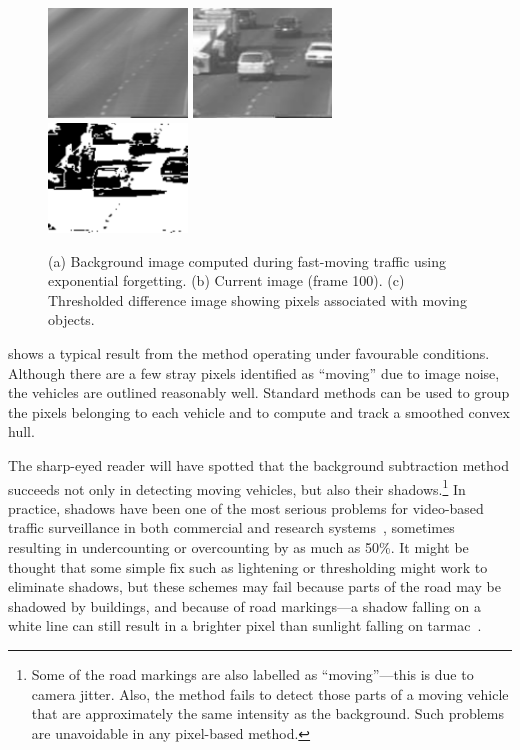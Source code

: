 \begin{figure}[t]
  \includegraphics[width=0.33\textwidth]{figures/avg_0099.pdf}
  \includegraphics[width=0.33\textwidth]{figures/img_0100.pdf}
  \includegraphics[width=0.33\textwidth]{figures/mask_0100.pdf}
  \caption{(a) Background image computed during fast-moving traffic
using exponential forgetting. (b) Current image (frame 100). (c) Thresholded
difference image showing pixels associated with moving objects.}
\label{fast-traffic-figure}
\end{figure}

 shows a typical result from the method
operating under favourable conditions. Although there are a few stray
pixels identified as ``moving'' due to image noise, the vehicles are
outlined reasonably well. Standard methods can be used to group the
pixels belonging to each vehicle and to compute and track a smoothed
convex hull.

The sharp-eyed reader will have spotted that the background
subtraction method succeeds not only in detecting moving vehicles, but
also their shadows.\footnote{Some of the road markings are also
labelled as ``moving''---this is due to camera jitter.
Also, the method fails to detect those parts of a moving vehicle that
are approximately the same intensity as the background.
Such problems are unavoidable in any pixel-based method.}
In practice, shadows have been one of the most
serious problems for video-based traffic surveillance in both
commercial and research systems~\cite{Michalopoulos:1991}, sometimes
resulting in undercounting or overcounting by as much as 50\%.  It
might be thought that some simple fix such as lightening or
thresholding might work to eliminate shadows, but these schemes may fail
because parts of the road may be shadowed by buildings, and because of
road markings---a shadow falling on a white line can still result in a
brighter pixel than sunlight falling on tarmac~\cite{Kilger:1992}.

